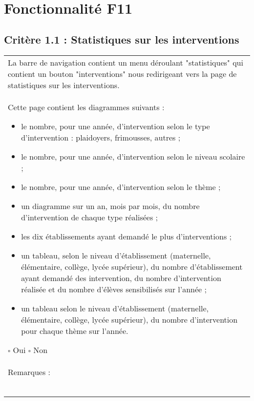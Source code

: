 
\section{Fonctionnalité F11}

	\subsection*{Critère 1.1 : Statistiques sur les interventions}
	
		\begin{center}
    	 		\begin{tabular}[h]{|p{}|}
			\hline
				La barre de navigation contient un menu déroulant "statistiques" qui contient un bouton "interventions" nous redirigeant vers la page de statistiques sur les interventions.\\
Cette page contient les diagrammes suivants :
		\begin{itemize}
			\item le nombre, pour une année, d'intervention selon le type d’intervention : plaidoyers, frimousses, autres ;
			\item le nombre, pour une année, d'intervention selon le niveau scolaire ;
			\item le nombre, pour une année, d'intervention selon le thème ;
			\item un diagramme sur un an, mois par mois, du nombre d'intervention de chaque type réalisées ;
			\item les dix établissements ayant demandé le plus d'interventions ;
			\item un tableau, selon le niveau d’établissement (maternelle, élémentaire, collège, lycée supérieur), du nombre d'établissement ayant demandé des intervention, du nombre d'intervention réalisée et du nombre d’élèves sensibilisés sur l'année ;
			\item un tableau selon le niveau d’établissement (maternelle, élémentaire, collège, lycée supérieur), du nombre d'intervention pour chaque thème sur l'année.
			
		\end{itemize}
				
				$\square$ Oui \hfill \hfill $\square$ Non \\\hline Remarques : \\ ~\\
			 \\\hline
     		\end{tabular}
  		\end{center}	

